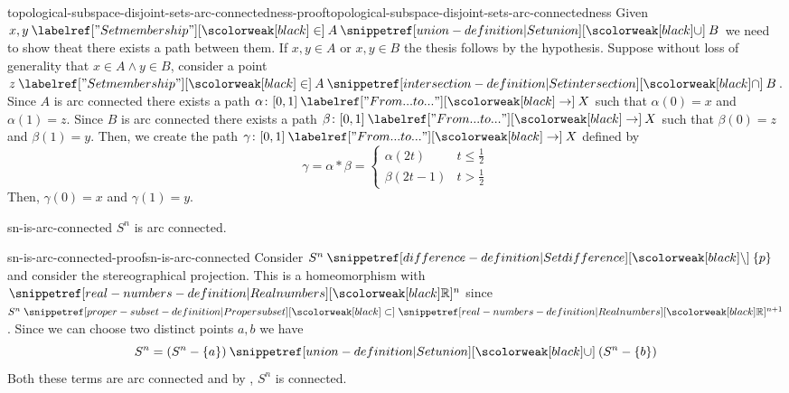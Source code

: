 \documentclass[preview]{standalone}
\begin{document}
\begin{snippetproof}{topological-subspace-disjoint-sets-arc-connectedness-proof}{topological-subspace-disjoint-sets-arc-connectedness}{}
    Given \(x,y \in A \union B\) we need to show theat there exists a path between them.
    If \(x,y \in A\) or \(x,y \in B\) the thesis follows by the hypothesis.
    Suppose without loss of generality that \(x\in A \land y \in B\),
    consider a point \(z \in A \intersection B\).
    Since \(A\) is arc connected there exists a path \(\alpha \colon [0,1] \fromto X\)
    such that \(\alpha(0) = x\) and \(\alpha(1) = z\).
    Since \(B\) is arc connected there exists a path \(\beta \colon [0,1] \fromto X\)
    such that \(\beta(0) = z\) and \(\beta(1) = y\).
    Then, we create the path \(\gamma \colon [0,1] \fromto X\)
    defined by \[
        \gamma = \alpha \ast \beta = \begin{cases}
            \alpha(2t) & t \leq \frac{1}{2} \\
            \beta(2t-1) & t > \frac{1}{2}
        \end{cases}
    \]
    Then,
    \(\gamma(0) = x\) and \(\gamma(1) = y\).
\end{snippetproof}

\begin{snippetproposition}{sn-is-arc-connected}{}
    \(S^n\) is arc connected.
\end{snippetproposition}

\begin{snippetproof}{sn-is-arc-connected-proof}{sn-is-arc-connected}{}
    Consider \(S^n \difference \{p\}\) and consider the stereographical projection.
    This is a homeomorphism with \(\realnumbers^n\) since \(S^n \subset \realnumbers^{n+1}\).
    Since we can choose two distinct points \(a, b\) we have
    \[
        S^n = (S^n - \{a\}) \union (S^n - \{b\})
    \]
    Both these terms are arc connected and by ,
    \(S^n\) is connected.
\end{snippetproof}

\end{document}
